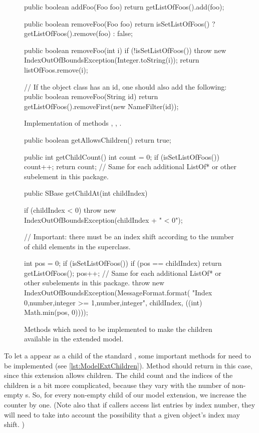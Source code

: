 \begin{figure}[t]
  \begin{example}[numbers=left]
public boolean addFoo(Foo foo) {
    return getListOfFoos().add(foo);
}

public boolean removeFoo(Foo foo) {
  return isSetListOfFoos() ? getListOfFoos().remove(foo) : false;
}

public boolean removeFoo(int i) {
  if (!isSetListOfFoos()) {
    throw new IndexOutOfBoundsException(Integer.toString(i));
  }
  return listOfFoos.remove(i);
}

// If the object class has an id, one should also add the following:
public boolean removeFoo(String id) {
  return getListOfFoos().removeFirst(new NameFilter(id));
}\end{example}
  \caption{Implementation of  methods ,
    , .}
  \label{lst:ModelExtAddRemoveFoos}
\end{figure}

\begin{figure}[hb]
  \begin{example}[numbers=left]
public boolean getAllowsChildren() {
  return true;
}

public int getChildCount() {
  int count = 0;
  if (isSetListOfFoos()) {
    count++;
  }
  return count;  // Same for each additional ListOf* or other subelement in this package.
}

public SBase getChildAt(int childIndex) {
  if (childIndex < 0) {
    throw new IndexOutOfBoundsException(childIndex + " < 0");
  }

  // Important: there must be an index shift according to the number of child elements in the superclass.

  int pos = 0;
  if (isSetListOfFoos()) {
    if (pos == childIndex) {
      return getListOfFoos();
    }
    pos++;
  }
  // Same for each additional ListOf* or other subelements in this package.
  throw new IndexOutOfBoundsException(MessageFormat.format(
    "Index {0,number,integer} >= {1,number,integer}", childIndex, ((int) Math.min(pos, 0))));
}\end{example}
  \caption{Methods which need to be implemented to make the children
    available in the extended model.}
  \label{lst:ModelExtChildren}
\end{figure}

To let a  appear as a child of the standard \Model, some
important methods for \TreeNode need to be implemented (see
\vref{lst:ModelExtChildren}).  Method  should
return  in this case, since this extension allows children.  The
child count and the indices of the children is a bit more complicated,
because they vary with the number of non-empty s.  So, for
every non-empty  child of our model extension, we increase the
counter by one.  (Note also that if callers access list entries by index
number, they will need to take into account the possibility that a given
object's index may shift. )


